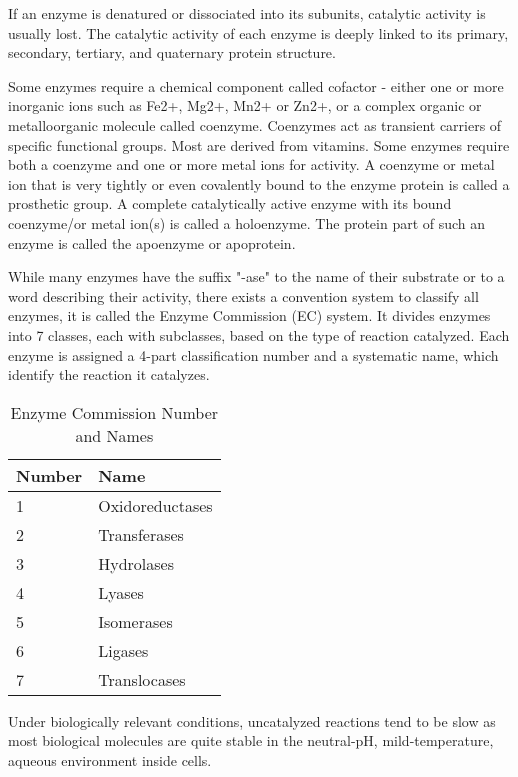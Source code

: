 If an enzyme is denatured or dissociated into its subunits, catalytic activity is usually lost. 
The catalytic activity of each enzyme is deeply linked to its primary, secondary, tertiary, 
and quaternary protein structure.

Some enzymes require a chemical component called cofactor - either one or more inorganic ions 
such as Fe2+, Mg2+, Mn2+ or Zn2+, or a complex organic or metalloorganic molecule called coenzyme. 
Coenzymes act as transient carriers of specific functional groups. Most are derived from vitamins.
Some enzymes require both a coenzyme and one or more metal ions for activity. A coenzyme or metal ion 
that is very tightly or even covalently bound to the enzyme protein is called a prosthetic group. 
A complete catalytically active enzyme with its bound coenzyme/or metal ion(s) is called a holoenzyme. 
The protein part of such an enzyme is called the apoenzyme or apoprotein.

While many enzymes have the suffix "-ase" to the name of their substrate or to a word describing
their activity, there exists a convention system to classify all enzymes, it is called the Enzyme Commission
(EC) system. \cite{EC} It divides enzymes into 7 classes, each with subclasses, based on the type of reaction
catalyzed. Each enzyme is assigned a 4-part classification number and a systematic name, which
identify the reaction it catalyzes.

\begin{table}[h!]
  \centering
  \begin{tabular}{ll}
  \hline
  \textbf{Number} & \textbf{Name} \\
  \hline
  1 & Oxidoreductases \\
  \hline
  2 & Transferases \\
  \hline
  3 & Hydrolases \\
  \hline
  4 & Lyases \\
  \hline
  5 & Isomerases \\
  \hline
  6 & Ligases \\
  \hline
  7 & Translocases \\
  \hline
  \end{tabular}
  \caption{Enzyme Commission Number and Names}
  \label{table:enzyme_names}
  \end{table}  

Under biologically relevant conditions, uncatalyzed reactions tend to be slow as most biological molecules
are quite stable in the neutral-pH, mild-temperature, aqueous environment inside cells.

